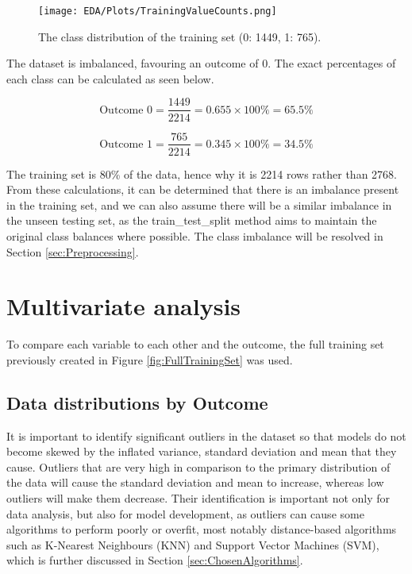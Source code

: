 \begin{figure}[H]
    \centering
    \texttt{[image: EDA/Plots/TrainingValueCounts.png]}
    \caption{The class distribution of the training set (0: 1449, 1: 765).}
    \label{fig:ClassImbalancePlot}
\end{figure}

\para The dataset is imbalanced, favouring an outcome of 0. The exact percentages 
of each class can be calculated as seen below.

\begin{equation}
    \text{Outcome 0} = \frac{1449}{2214} = 0.655 \times 100\% = 65.5\%
\end{equation}

\begin{equation}
    \text{Outcome 1} = \frac{765}{2214} = 0.345 \times 100\% = 34.5\%
\end{equation}

\para The training set is 80\% of the data, hence why it is 2214 rows rather than 2768. From these calculations, it can be determined that 
there is an imbalance present in the training set, and we can also assume there will be a similar imbalance in the unseen testing set, as the train\_test\_split method 
aims to maintain the original class balances where possible. The class imbalance will be resolved in Section \ref{sec:Preprocessing}.



\section{Multivariate analysis}
To compare each variable to each other and the outcome, the full training set previously  
created in Figure \ref{fig:FullTrainingSet} was used.

\subsection{Data distributions by Outcome}

It is important to identify significant outliers in the dataset so that models do not become skewed by the inflated variance, standard 
deviation and mean that they cause. Outliers that are very high in comparison to the primary distribution of the data will cause the 
standard deviation and mean to increase, whereas low outliers will make them decrease. Their identification is important not only for data analysis, 
but also for model development, as outliers can cause some algorithms to perform poorly or overfit, most notably distance-based algorithms 
such as K-Nearest Neighbours (KNN) and Support Vector Machines (SVM), which is further discussed in Section \ref{sec:ChosenAlgorithms}. 

